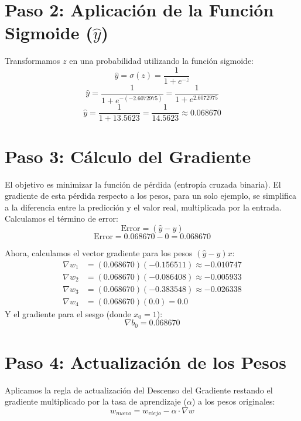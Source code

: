 \documentclass{article}
\begin{document}
\section*{Paso 2: Aplicación de la Función Sigmoide ($\hat{y}$)}
Transformamos $z$ en una probabilidad utilizando la función sigmoide:
\begin{equation}
    \hat{y} = \sigma(z) = \frac{1}{1 + e^{-z}}
\end{equation}
\begin{equation*}
    \hat{y} = \frac{1}{1 + e^{-(-2.6072975)}} = \frac{1}{1 + e^{2.6072975}}
\end{equation*}
\begin{equation*}
    \hat{y} = \frac{1}{1 + 13.5623} = \frac{1}{14.5623} \approx 0.068670
\end{equation*}

\section*{Paso 3: Cálculo del Gradiente}
El objetivo es minimizar la función de pérdida (entropía cruzada binaria). El gradiente de esta pérdida respecto a los pesos, para un solo ejemplo, se simplifica a la diferencia entre la predicción y el valor real, multiplicada por la entrada. 
Calculamos el término de error:
\begin{equation}
    \text{Error} = (\hat{y} - y)
\end{equation}
\begin{equation*}
    \text{Error} = 0.068670 - 0 = 0.068670
\end{equation*}

Ahora, calculamos el vector gradiente para los pesos $(\hat{y} - y)x$:
\begin{align*}
    \nabla w_1 &= (0.068670)(-0.156511) \approx -0.010747 \\
    \nabla w_2 &= (0.068670)(-0.086408) \approx -0.005933 \\
    \nabla w_3 &= (0.068670)(-0.383548) \approx -0.026338 \\
    \nabla w_4 &= (0.068670)(0.0) = 0.0
\end{align*}
Y el gradiente para el sesgo (donde $x_0 = 1$):
\begin{equation*}
    \nabla b_0 = 0.068670
\end{equation*}

\section*{Paso 4: Actualización de los Pesos}
Aplicamos la regla de actualización del Descenso del Gradiente restando el gradiente multiplicado por la tasa de aprendizaje ($\alpha$) a los pesos originales:
\begin{equation}
    w_{nuevo} = w_{viejo} - \alpha \cdot \nabla w
\end{equation}
\end{document}
